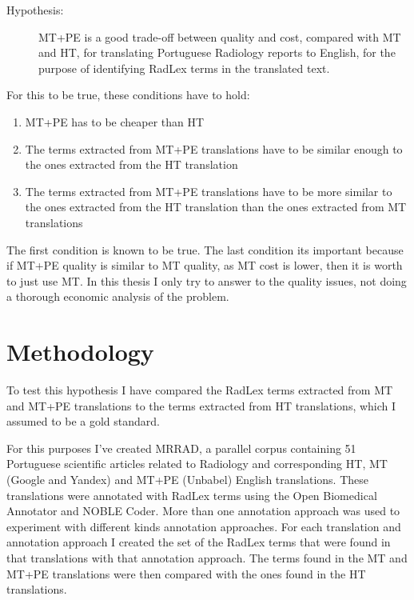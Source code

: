 \newcommand{\hypothesis}{
\begin{description}
	\item[Hypothesis:] MT+PE is a good trade-off between quality and cost, compared with MT and HT, for translating Portuguese Radiology reports to English, for the purpose of identifying RadLex terms in the translated text. 
\end{description}
}
\hypothesis

For this to be true, these conditions have to hold:

\begin{enumerate}
	\item MT+PE has to be cheaper than HT
	\item The terms extracted from MT+PE translations have to be similar enough to the ones extracted from the HT translation
	\item The terms extracted from MT+PE translations have to be more similar to the ones extracted from the HT translation than the ones extracted from MT translations
\end{enumerate}

The first condition is known to be true. The last condition its important because if MT+PE quality is similar to MT quality, as MT cost is lower, then it is worth to just use MT. In this thesis I only try to answer to the quality issues, not doing a thorough economic analysis of the problem. 

\section{Methodology}

To test this hypothesis I have compared the RadLex terms extracted from MT and MT+PE translations to the terms extracted from HT translations, which I assumed to be a gold standard.

For this purposes I've created MRRAD, a parallel corpus containing 51 Portuguese scientific articles related to Radiology and corresponding HT, MT (Google and Yandex) and MT+PE (Unbabel) English translations. These translations were annotated with RadLex terms using the Open Biomedical Annotator and NOBLE Coder. More than one annotation approach was used to experiment with different kinds annotation approaches. For each translation and annotation approach I created the set of the RadLex terms that were found in that translations with that annotation approach. The terms found in the MT and MT+PE translations were then compared with the ones found in the HT translations.


